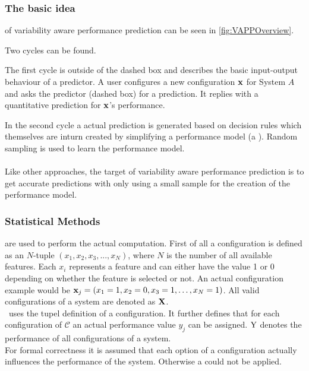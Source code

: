 \subsubsection[Basic Idea]{\textnormal{The} basic idea} of variability aware performance prediction can be seen in \autoref{fig:VAPPOverview}.

Two cycles can be found. 

The first cycle is outside of the dashed box and describes the basic input-output behaviour of a predictor. A user configures a new configuration $\mathrm{\mathbf{x}}$ for System $A$ and asks the predictor (dashed box) for a prediction. It replies with a quantitative prediction for $\mathrm{\mathbf{x}}$'s performance.

In the second cycle a actual prediction is generated based on decision rules which themselves are inturn created by simplifying a performance model (a \CART). Random sampling is used to learn the performance model.
\\\\
Like other approaches, the target of variability aware performance prediction is to get accurate predictions with only using a small sample for the creation of the performance model.

\FloatBarrier %
\subsubsection{Statistical Methods}\label{sec:VAPPMethods} are used to perform the actual computation. First of all a configuration is defined as an $N$-tuple $(x_1,x_2,x_3,...,x_N)$, where $N$ is the number of all available features. Each $x_i$ represents a feature and can either have the value 1 or 0 depending on whether the feature is selected or not. An actual configuration example would be $\mathrm{\mathbf{x}}_j = (x_1=1,x_2=0,x_3=1,\dots,x_N = 1)$. All valid configurations of a system are denoted as $\mathbf{X}$.\\

\VAPP~uses the tupel definition of a configuration. It further defines that for each configuration of $\mathcal{C}$ an actual performance value $y_j$ can be assigned. $\mathrm{Y}$ denotes the performance of all configurations of a system.\\
For formal correctness it is assumed that each option of a configuration actually influences the performance of the system. Otherwise a \CART could not be applied.

